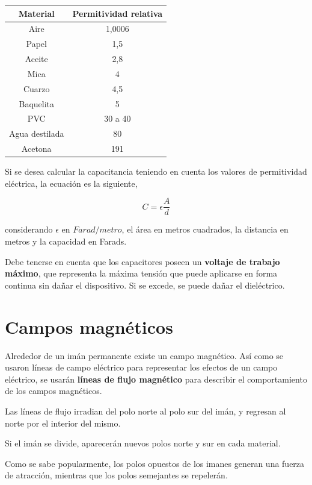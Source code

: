 \begin{tabular}{|c|c|}
\hline 
Material & Permitividad relativa \\ 
\hline 
Aire & 1,0006 \\ 
\hline 
Papel & 1,5 \\ 
\hline 
Aceite & 2,8 \\ 
\hline 
Mica & 4 \\ 
\hline 
Cuarzo & 4,5 \\ 
\hline 
Baquelita & 5 \\ 
\hline 
PVC & 30 a 40 \\ 
\hline 
Agua destilada & 80 \\ 
\hline 
Acetona & 191 \\ 
\hline 
\end{tabular} 

Si se desea calcular la capacitancia teniendo en cuenta los valores de permitividad eléctrica, la ecuación es la siguiente,

\begin{equation}
	\label{eq:capacitancia_permitividad}
	C = \epsilon \frac{A}{d}
\end{equation}

considerando $\epsilon $ en $Farad/metro$, el área en metros cuadrados, la distancia en metros y la capacidad en Farads.

Debe tenerse en cuenta que los capacitores poseen un \textbf{voltaje de trabajo máximo}, que representa la máxima tensión que puede aplicarse en forma continua sin dañar el dispositivo. Si se excede, se puede dañar el dieléctrico.

\section{Campos magnéticos}

Alrededor de un imán permanente existe un campo magnético. Así como se usaron líneas de campo eléctrico para representar los efectos de un campo eléctrico, se usarán \textbf{líneas de flujo magnético} para describir el comportamiento de los campos magnéticos.

Las líneas de flujo irradian del polo norte al polo sur del imán, y regresan al norte por el interior del mismo.

Si el imán se divide, aparecerán nuevos polos norte y sur en cada material.

Como se sabe popularmente, los polos opuestos de los imanes generan una fuerza de atracción, mientras que los polos semejantes se repelerán.

